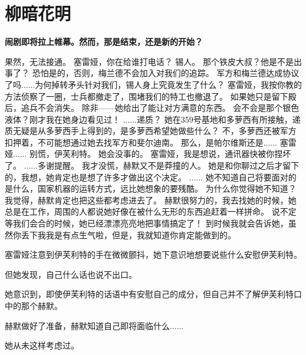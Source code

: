 \documentclass[openany]{book}
\begin{document}
\chapter{柳暗花明}
\begin{center} \textbf{闹剧即将拉上帷幕。然而，那是结束，还是新的开始？}\end{center} \par
\clearpage
\begin{dialogue}
     果然，无法接通。
     塞雷娅，你在给谁打电话？
     锡人。
     那个铁皮大叔？他是不是出事了？
     恐怕是的，否则，梅兰德不会加入对我们的追踪。
     军方和梅兰德达成协议了吗......为何掉转矛头针对我们，锡人身上究竟发生了什么？
     塞雷娅，我按你教的方法侦察了一圈，士兵都撤走了，围堵我们的特工也撤退了。
     如果她只是留下殿后，追兵不会消失。
     除非——她给出了能让对方满意的东西。
     会不会是那个银色液体？刚才我在她身边看见过！
     ......递质？
     她在359号基地和多萝西有所接触，递质无疑是从多萝西手上得到的，是多萝西希望她做些什么？
     不，多萝西还被军方扣押着，不可能想通过她去找军方和斐尔迪南。
     那么，是帕尔维斯还是......
     塞雷娅......
     别慌，伊芙利特。
     她会没事的。
     塞雷娅，我是想说，通讯器快被你捏坏了。
     ......多谢提醒。
     我才没慌，赫默又不是莽撞的人。
     她是和你聊过之后才留下的，我想，她肯定也是想了许多才做出这个决定。
     ......
     她不知道自己将要面对的是什么，国家机器的运转方式，远比她想象的要残酷。
     为什么你觉得她不知道？我觉得，赫默肯定也把这些都考虑进去了。
     赫默很努力的，我去找她的时候，她总是在工作，周围的人都说她好像在被什么无形的东西追赶着一样拼命。
     说不定等我们会合的时候，她已经漂漂亮亮地把事情搞定了！
     到时候我就会告诉她，虽然你丢下我我是有点生气啦，但是，我就知道你肯定能做到的。
\end{dialogue}

\par
塞雷娅注意到伊芙利特的手在微微颤抖，她下意识地想要说些什么安慰伊芙利特。\par
但她发现，自己什么话也说不出口。\par
她意识到，即使伊芙利特的话语中有安慰自己的成分，但自己并不了解伊芙利特口中的那个赫默。\par
赫默做好了准备，赫默知道自己即将面临什么......\par
她从未这样考虑过。\par
\end{document}
